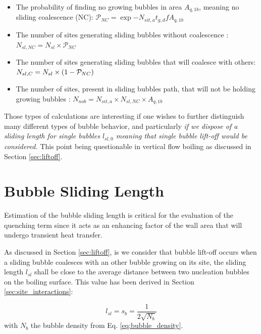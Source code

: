 \begin{itemize}
\item The probability of finding no growing bubbles in area $A_{q,1b}$, meaning no sliding coalescence (NC): $\mathcal{P}_{NC} = \exp{-N_{sit,a}t_{g,d}f A_{q,1b}}$  
\item The number of sites generating sliding bubbles without coalescence  : $N_{sl,NC} = N_{sl} \times \mathcal{P}_{NC}$
\item The number of sites generating sliding bubbles that will coalesce with others: $N_{sl,C} = N_{sl} \times \left( 1-\mathcal{P}_{NC} \right)$
\item The number of sites, present in sliding bubbles path, that will not be holding growing bubbles : $N_{nob} = N_{sit,a} \times N_{sl,NC} \times A_{q,1b}$
\end{itemize}

Those types of calculations are interesting if one wishes to further distinguish many different types of bubble behavior, and particularly \textit{if we dispose of a sliding length for single bubbles $l_{sl,0}$ meaning that single bubble lift-off would be considered.} This point being questionable in vertical flow boiling as discussed in Section \ref{sec:liftoff}.








\section{Bubble Sliding Length}
\label{sec:sliding_length}

Estimation of the bubble sliding length is critical for the evaluation of the quenching term since it acts as an enhancing factor of the wall area that will undergo transient heat transfer.

\npar

As discussed in Section \ref{sec:liftoff}, is we consider that bubble lift-off occurs when a sliding bubble coalesces with an other bubble growing on its site, the sliding length $l_{sl}$ shall be close to the average distance between two nucleation bubbles on the boiling surface. This value has been derived in Section \ref{sec:site_interactions}:

\begin{equation}
l_{sl} = s_{b} = \frac{1}{2\sqrt{N_{b}}}
\label{eq:sliding_length}
\end{equation}
with $N_{b}$ the bubble density from Eq. \ref{eq:bubble_density}.

